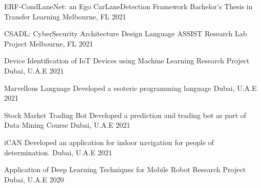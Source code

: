 




\begin{cvhonors}


\cvhonor
{ERF-CondLaneNet: an Ego CarLaneDetection Framework}
{Bachelor's Thesis in Transfer Learning}
{Melbourne, FL}
{2021}

\cvhonor
{CSADL: CyberSecurity Architecture Design Language}
{ASSIST Research Lab Project}
{Melbourne, FL}
{2021}

\cvhonor
{Device Identification of IoT Devices using Machine Learning}
{Research Project}
{Dubai, U.A.E}
{2021}

\cvhonor
{Marvellous Language}
{Developed a esoteric programming language}
{Dubai, U.A.E}
{2021}

\cvhonor
{Stock Market Trading Bot}
{Developed a prediction and trading bot as part of Data Mining Course}
{Dubai, U.A.E}
{2021}

\cvhonor
{iCAN}
{Developed an application for indoor navigation for people of determination.}
{Dubai, U.A.E}
{2021}


\cvhonor
{Application of Deep Learning Techniques for Mobile Robot}
{Research Project}
{Dubai, U.A.E}
{2020}






\end{cvhonors}
